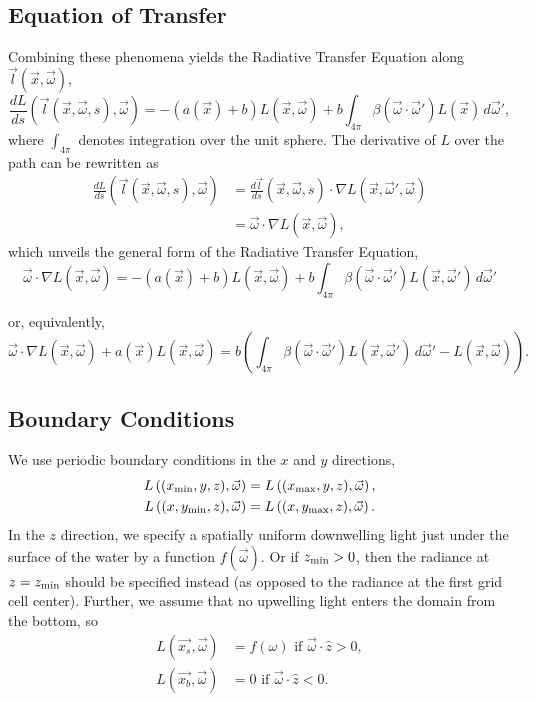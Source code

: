 \subsection{Equation of Transfer}
Combining these phenomena yields the Radiative Transfer Equation along
$\vec{l}(\vec{x}, \vec{\omega})$,
\begin{equation}
  \label{eqn:rte1d}
  \frac{dL}{ds}(\vec{l}(\vec{x}, \vec{\omega}, s), \vec{\omega})
  = -(a(\vec{x}) + b)L(\vec{x}, \vec{\omega})
  + b \int_{4\pi} \beta(\vec{\omega}\cdot\vec{\omega}') L(\vec{x})\, d\vec{\omega}',
\end{equation}
where $\int_{4\pi}$ denotes integration over the unit sphere.
The derivative of $L$ over the path can be rewritten as
\begin{align*}
  \frac{dL}{ds}(\vec{l}(\vec{x}, \vec{\omega}, s), \vec{\omega})
    &= \frac{d\vec{l}}{ds}(\vec{x}, \vec{\omega}, s) \cdot \nabla L(\vec{x}, \vec{\omega}', \vec{\omega}) \\
    &= \vec{\omega} \cdot \nabla L(\vec{x}, \vec{\omega}),
\end{align*}
which unveils the general form of the Radiative Transfer Equation,
\begin{equation*}
  \vec{\omega} \cdot \nabla L(\vec{x}, \vec{\omega})
  = -(a(\vec{x}) + b)L(\vec{x}, \vec{\omega})
  + b \int_{4\pi} \beta(\vec{\omega}\cdot\vec{\omega}') L(\vec{x}, \vec{\omega}')\, d\vec{\omega}'
\end{equation*}

or, equivalently,
\begin{equation}
  \vec{\omega} \cdot \nabla L(\vec{x}, \vec{\omega})
  + a(\vec{x})L(\vec{x}, \vec{\omega})
  = b \left(
    \int_{4\pi} \beta(\vec{\omega}\cdot\vec{\omega}') L(\vec{x}, \vec{\omega}')\, d\vec{\omega}'
    - L(\vec{x}, \vec{\omega})
  \right).
  \label{eqn:rte}
\end{equation}

\subsection{Boundary Conditions}

We use periodic boundary conditions in the $x$ and $y$ directions,
\begin{align*}
  L\left(({x_{\min}}, y, z), \vec{\omega}\right) &= L\left(({x_{\max}}, y, z), \vec{\omega}\right), \\
  L\left((x, {y_{\min}}, z), \vec{\omega}\right) &= L\left((x, {y_{\max}}, z), \vec{\omega}\right).
\end{align*}
In the $z$ direction, we specify a spatially uniform downwelling light just
under the surface of the water by a function $f(\vec{\omega})$.
Or if ${z_{\min}}>0$, then the radiance at $z={z_{\min}}$ should be specified instead (as opposed to the radiance at the first grid cell center).
Further, we assume that no upwelling light enters the domain from the bottom, so
\begin{align*}
  L(\vec{x_s}, \vec{\omega}) &= f(\omega) \mbox{ if } \vec{\omega} \cdot \hat{z} > 0, \\ 
  L(\vec{x_b}, \vec{\omega}) &= 0 \mbox { if } \vec{\omega} \cdot \hat{z} < 0.
\end{align*}
 
